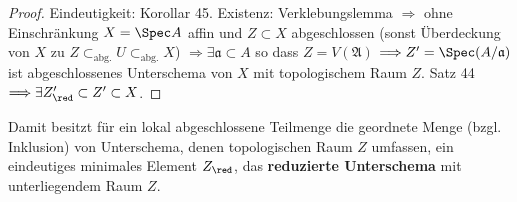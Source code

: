 \begin{proof}
  Eindeutigkeit: Korollar 45. Existenz: Verklebungslemma $\Longrightarrow$
  ohne Einschränkung $X=\Spec A$ affin und $Z\subset X$ abgeschlossen
  (sonst Überdeckung von $X$ zu $Z\subset_{\text{abg.}}U\subset_{\text{abg.}}X$)
  $\Longrightarrow\exists\mathfrak{a}\subset A$ so dass $Z=V(\mathfrak{A})$
  $\Longrightarrow Z'=\Spec(A/\mathfrak{a})$ ist abgeschlossenes Unterschema
  von $X$ mit topologischem Raum $Z$. Satz 44 $\Longrightarrow\exists Z'_{\red}\subset Z'\subset X$.
\end{proof}
Damit besitzt für ein lokal abgeschlossene Teilmenge die geordnete
Menge (bzgl. Inklusion) von Unterschema, denen topologischen Raum
$Z$ umfassen, ein eindeutiges minimales Element $Z_{\red}$, das
\textbf{reduzierte Unterschema} mit unterliegendem Raum $Z$.

